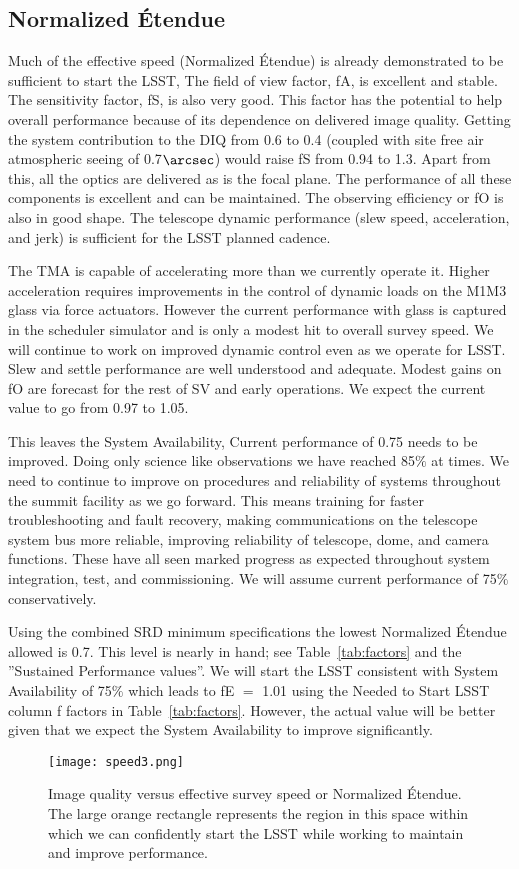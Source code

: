 \subsection{Normalized \'{E}tendue}
Much of the effective speed (Normalized  \'{E}tendue) is already demonstrated to be sufficient to start the LSST, The field of view factor, fA, is excellent and stable. The sensitivity factor, fS, is also very good. This factor has the potential to help overall performance because of its dependence on delivered image quality. Getting the system contribution to the DIQ from 0.6 to 0.4 (coupled with site free air atmospheric seeing of 0.7$\arcsec$) would raise fS from 0.94 to 1.3. Apart from this, all the optics are delivered as is the focal plane. The performance of all these components is excellent and can be maintained. The observing efficiency or fO is also in good shape. The telescope dynamic performance (slew speed, acceleration, and jerk) is sufficient for the LSST planned cadence. 

The TMA is capable of accelerating more than we currently operate it. Higher acceleration requires improvements in the control of dynamic loads on the M1M3 glass via force actuators. However the current performance with glass is captured in the scheduler simulator and is only a modest hit to overall survey speed. We will continue to work on improved dynamic control even as we operate for LSST. Slew and settle performance are well understood and adequate. Modest gains on fO are forecast for the rest of SV and early operations. We expect the current value to go from 0.97 to 1.05. 

This leaves the System Availability, Current performance of 0.75 needs to be improved. Doing only science like observations we have reached 85$\%$ at times. We need to continue to improve on procedures and reliability of systems throughout the summit facility as we go forward. This means training for faster troubleshooting and fault recovery, making communications on the telescope system bus more reliable, improving reliability of telescope, dome, and camera functions. These have all seen marked progress as expected throughout system integration, test, and commissioning. We will assume current performance of 75$\%$ conservatively. 

Using the combined SRD minimum specifications the lowest Normalized \'{E}tendue allowed is 0.7. This level is nearly in hand; see Table~\ref{tab:factors} and the ''Sustained Performance values''. We will start the LSST consistent with System Availability of 75$\%$ which leads to fE $=$ 1.01 using the Needed to Start LSST column f factors in Table~\ref{tab:factors}. However, the actual value will be better given that we expect the System Availability to improve significantly. 

\begin{figure}[t]
\centering
\texttt{[image: speed3.png]}
\caption{Image quality versus effective survey speed or Normalized \'{E}tendue. The large orange rectangle represents the region in this space within which we can confidently start the LSST while working to maintain and improve performance.}
\label{speed3}
\end{figure}

\newpage
